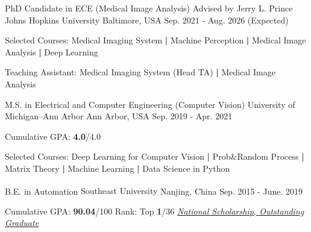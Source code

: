 

\begin{cventries}
\vspace{-0.15cm}
\cventry
{PhD Candidate in ECE (Medical Image Analysis) Advised by Jerry L. Prince } %
{Johns Hopkins University} %
{Baltimore, USA} %
{Sep. 2021 - Aug. 2026 (Expected)} %
{
	\begin{cvitems} %
		\item {Selected Courses:
			Medical Imaging System \textbf{|} Machine Perception \textbf{|} Medical Image Analysis \textbf{|} Deep Learning
		}\item Teaching Assistant: Medical Imaging System (Head TA) \textbf{|} Medical Image Analysis
	\end{cvitems}
}

\cventry
    {M.S. in Electrical and Computer Engineering (Computer Vision)} %
    {University of Michigan--Ann Arbor} %
    {Ann Arbor, USA} %
    {Sep. 2019 - Apr. 2021} %
    {
      \begin{cvitems} %
      \item {Cumulative GPA: \textbf{4.0}/4.0}
        \item {Selected Courses:
          Deep Learning for Computer Vision \textbf{|} Prob\&Random Process \textbf{|} Matrix Theory \textbf{|} Machine Learning \textbf{|} Data Science in Python
                }
      \end{cvitems}
    }

\vspace{-0.1cm}
  \cventry
    {B.E. in Automation} %
    {Southeast University\textsuperscript{}} %
    {Nanjing, China} %
    {Sep. 2015 - June. 2019} %
    {
      \begin{cvitems} %
        \item {Cumulative GPA: \textbf{90.04}/100 \qquad Rank: Top \textbf{1}/36 \qquad \underline{\textit{National Scholarship, Outstanding Graduate}}}
      \end{cvitems}
    }

\end{cventries}